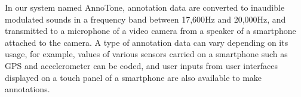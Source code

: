 In our system named AnnoTone, annotation data are converted to inaudible modulated sounds in a frequency band between 17,600Hz and 20,000Hz, and transmitted to a microphone of a video camera from a speaker of a smartphone attached to the camera.
A type of annotation data can vary depending on its usage, for example, values of various sensors carried on a smartphone such as GPS and accelerometer can be coded, and user inputs from user interfaces displayed on a touch panel of a smartphone are also available to make annotations.
